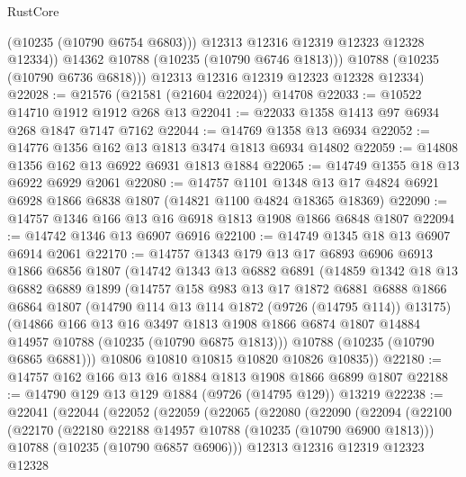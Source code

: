 \begin{lexlean}{RustCore}
\begin{coremodule}
                (@10235 (@10790 @6754 @6803)))
              @12313
              @12316
              @12319
              @12323
              @12328
              @12334))
          @14362
          @10788
          (@10235 (@10790 @6746 @1813)))
        @10788
        (@10235 (@10790 @6736 @6818)))
      @12313
      @12316
      @12319
      @12323
      @12328
      @12334)
@22028 := @21576 (@21581 (@21604 @22024)) @14708
@22033 := @10522 @14710 @1912 @1912 @268 @13
@22041 := @22033 @1358 @1413 @97 @6934 @268 @1847 @7147 @7162
@22044 := @14769 @1358 @13 @6934
@22052 := @14776 @1356 @162 @13 @1813 @3474 @1813 @6934 @14802
@22059 := @14808 @1356 @162 @13 @6922 @6931 @1813 @1884
@22065 := @14749 @1355 @18 @13 @6922 @6929 @2061
@22080 := @14757
    @1101
    @1348
    @13
    @17
    @4824
    @6921
    @6928
    @1866
    @6838
    @1807
    (@14821 @1100 @4824 @18365 @18369)
@22090 := @14757 @1346 @166 @13 @16 @6918 @1813 @1908 @1866 @6848 @1807
@22094 := @14742 @1346 @13 @6907 @6916
@22100 := @14749 @1345 @18 @13 @6907 @6914 @2061
@22170 := @14757
    @1343
    @179
    @13
    @17
    @6893
    @6906
    @6913
    @1866
    @6856
    @1807
    (@14742
      @1343
      @13
      @6882
      @6891
      (@14859
        @1342
        @18
        @13
        @6882
        @6889
        @1899
        (@14757
          @158
          @983
          @13
          @17
          @1872
          @6881
          @6888
          @1866
          @6864
          @1807
          (@14790 @114 @13 @114 @1872 (@9726 (@14795 @114)) @13175)
          (@14866
            @166
            @13
            @16
            @3497
            @1813
            @1908
            @1866
            @6874
            @1807
            @14884
            @14957
            @10788
            (@10235 (@10790 @6875 @1813)))
          @10788
          (@10235 (@10790 @6865 @6881)))
        @10806
        @10810
        @10815
        @10820
        @10826
        @10835))
@22180 := @14757 @162 @166 @13 @16 @1884 @1813 @1908 @1866 @6899 @1807
@22188 := @14790 @129 @13 @129 @1884 (@9726 (@14795 @129)) @13219
@22238 := @22041
    (@22044
      (@22052
        (@22059
          (@22065
            (@22080
              (@22090
                (@22094
                  (@22100
                    (@22170
                      (@22180 @22188 @14957 @10788 (@10235 (@10790 @6900 @1813)))
                      @10788
                      (@10235 (@10790 @6857 @6906)))
                    @12313
                    @12316
                    @12319
                    @12323
                    @12328

\end{coremodule}
\end{lexlean}
